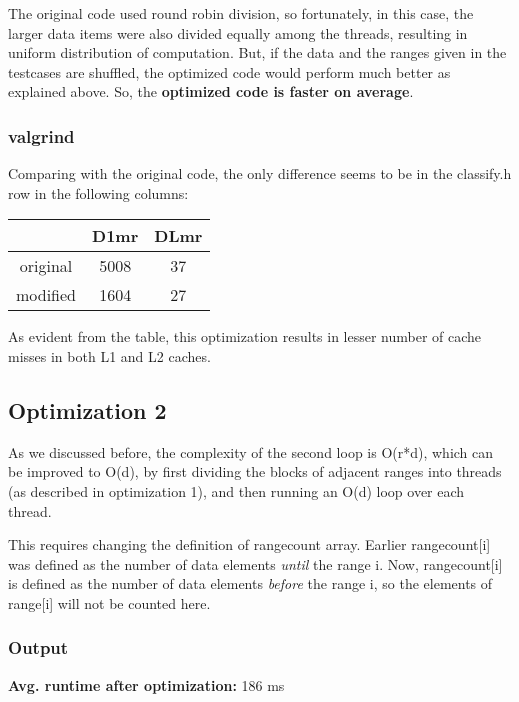 \documentclass{article}
\begin{document}
    The original code used round robin division, so fortunately, in this case, the larger data items were also divided equally among the threads, resulting in uniform distribution of computation. But, if the data and the ranges given in the testcases are shuffled, the optimized code would perform much better as explained above. So, the \textbf{optimized code is faster on average}.

    \subsubsection{valgrind}
    Comparing with the original code, the only difference seems to be in the classify.h row in the following columns:
    
    \begin{center}
        \begin{tabular}{|c|c|c|}
            \hline
             & \textbf{D1mr} & \textbf{DLmr} \\
            \hline
            original & 5008 & 37 \\
            \hline
            modified & 1604 & 27 \\
            \hline
        \end{tabular}
    \end{center}

    As evident from the table, this optimization results in lesser number of cache misses in both L1 and L2 caches. 

    \subsection{Optimization 2}
    As we discussed before, the complexity of the second loop is O(r*d), which can be improved to O(d), by first dividing the blocks of adjacent ranges into threads (as described in optimization 1), and then running an O(d) loop over each thread. 
    
    This requires changing the definition of rangecount array. Earlier rangecount[i] was defined as the number of data elements \textit{until} the range i. Now, rangecount[i] is defined as the number of data elements \textit{before} the range i, so the elements of range[i] will not be counted here. 
    
    \subsubsection{Output}
    \noindent
    \textbf{Avg. runtime after optimization:} 186 ms \\
\end{document}
